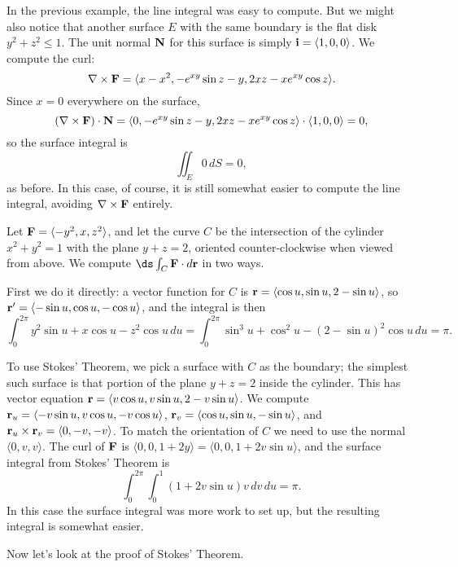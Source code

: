 \begin{example}{}{}
In the previous example, the line integral was easy to
compute. But we might also notice that another surface $E$ with the
same boundary is the flat disk $y^2+z^2\le 1$. The unit normal $\bf N$
for this surface is simply ${\bf i}=\langle 1,0,0\rangle$. We compute
the curl:
$$\nabla\times{\bf F}=\langle x-x^2,-e^{xy}\sin z-y,2xz-xe^{xy}\cos
z\rangle.$$ 
Since $x=0$ everywhere on the surface,
$$(\nabla\times{\bf F})\cdot {\bf N}=
\langle 0,-e^{xy}\sin z-y,2xz-xe^{xy}\cos
z\rangle\cdot\langle 1,0,0\rangle=0,$$
so the surface integral is
$$\iint_{E}0\,dS=0,$$
as before. In this case, of course, it is still somewhat easier to
compute the line integral, avoiding $\nabla\times{\bf F}$ entirely.
\end{example}

\begin{example}{}{}
Let ${\bf F}=\langle -y^2,x,z^2\rangle$, and let the curve $C$
be the intersection of the cylinder $x^2+y^2=1$ with the plane
$y+z=2$, oriented counter-clockwise when viewed from above.
We compute $\ds\int_C {\bf F}\cdot d{\bf r}$ in two ways.

First we do it directly: a vector function for $C$ is
${\bf r}=\langle \cos u,\sin u, 2-\sin u\rangle$, so
${\bf r}'=\langle -\sin u,\cos u,-\cos u\rangle$, and the integral is then
$$\int_0^{2\pi} y^2\sin u+x\cos u-z^2\cos u\,du
=\int_0^{2\pi} \sin^3 u+\cos^2 u-(2-\sin u)^2\cos u\,du
=\pi.$$

To use Stokes' Theorem, we pick a surface with $C$ as the boundary;
the simplest such surface is that portion of the plane $y+z=2$ inside
the cylinder. This has vector equation ${\bf r}=\langle
v\cos u,v\sin u,2-v\sin u\rangle$. We compute
${\bf r}_u= \langle -v\sin u,v\cos u,-v\cos u\rangle$,
${\bf r}_v= \langle \cos u,\sin u, -\sin u\rangle$, and 
${\bf r}_u\times{\bf r}_v=\langle 0,-v,-v\rangle$. To match the
orientation of $C$ we need to use the normal $\langle
0,v,v\rangle$. The curl of $\bf F$ is $\langle 0,0,1+2y\rangle=
\langle 0,0,1+2v\sin u\rangle$, and
the surface integral from Stokes' Theorem is
$$\int_0^{2\pi}\int_0^1 (1+2v\sin u)v\,dv\,du=\pi.$$
In this case the surface integral was more work to set up, but the
resulting integral is somewhat easier.
\end{example}

Now let's look at the proof of Stokes' Theorem.

